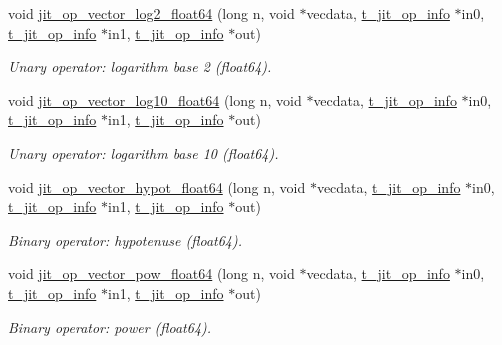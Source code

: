 \begin{DoxyCompactItemize}
void \hyperlink{group__opvecmod_ga85c60d306d73bb29cf675c6d1da91e44}{jit\_\-op\_\-vector\_\-log2\_\-float64} (long n, void $\ast$vecdata, \hyperlink{structt__jit__op__info}{t\_\-jit\_\-op\_\-info} $\ast$in0, \hyperlink{structt__jit__op__info}{t\_\-jit\_\-op\_\-info} $\ast$in1, \hyperlink{structt__jit__op__info}{t\_\-jit\_\-op\_\-info} $\ast$out)
\begin{DoxyCompactList}\small\item\em Unary operator: logarithm base 2 (float64). \item\end{DoxyCompactList}\item 
void \hyperlink{group__opvecmod_gad819f34d227cfc92b4ed72972f4036ea}{jit\_\-op\_\-vector\_\-log10\_\-float64} (long n, void $\ast$vecdata, \hyperlink{structt__jit__op__info}{t\_\-jit\_\-op\_\-info} $\ast$in0, \hyperlink{structt__jit__op__info}{t\_\-jit\_\-op\_\-info} $\ast$in1, \hyperlink{structt__jit__op__info}{t\_\-jit\_\-op\_\-info} $\ast$out)
\begin{DoxyCompactList}\small\item\em Unary operator: logarithm base 10 (float64). \item\end{DoxyCompactList}\item 
void \hyperlink{group__opvecmod_ga6eb8c731eafa72ddc056782f7c3449d0}{jit\_\-op\_\-vector\_\-hypot\_\-float64} (long n, void $\ast$vecdata, \hyperlink{structt__jit__op__info}{t\_\-jit\_\-op\_\-info} $\ast$in0, \hyperlink{structt__jit__op__info}{t\_\-jit\_\-op\_\-info} $\ast$in1, \hyperlink{structt__jit__op__info}{t\_\-jit\_\-op\_\-info} $\ast$out)
\begin{DoxyCompactList}\small\item\em Binary operator: hypotenuse (float64). \item\end{DoxyCompactList}\item 
void \hyperlink{group__opvecmod_ga1c047117c29b033974b73cc99e7b6de1}{jit\_\-op\_\-vector\_\-pow\_\-float64} (long n, void $\ast$vecdata, \hyperlink{structt__jit__op__info}{t\_\-jit\_\-op\_\-info} $\ast$in0, \hyperlink{structt__jit__op__info}{t\_\-jit\_\-op\_\-info} $\ast$in1, \hyperlink{structt__jit__op__info}{t\_\-jit\_\-op\_\-info} $\ast$out)
\begin{DoxyCompactList}\small\item\em Binary operator: power (float64). \item\end{DoxyCompactList}\item 

\end{DoxyCompactItemize}
